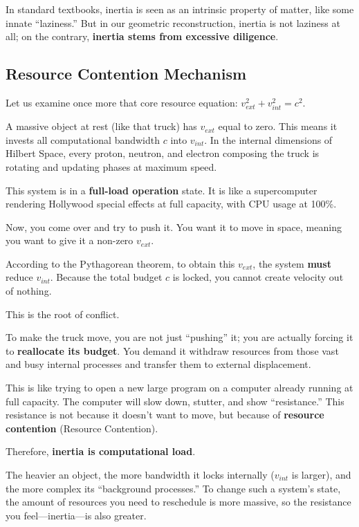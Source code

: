 \documentclass[11pt,a4paper,twoside]{book}
\begin{document}
In standard textbooks, inertia is seen as an intrinsic property of matter, like some innate ``laziness.'' But in our geometric reconstruction, inertia is not laziness at all; on the contrary, \textbf{inertia stems from excessive diligence}.

\subsection{Resource Contention Mechanism}

Let us examine once more that core resource equation: $v_{ext}^2 + v_{int}^2 = c^2$.

A massive object at rest (like that truck) has $v_{ext}$ equal to zero. This means it invests all computational bandwidth $c$ into $v_{int}$. In the internal dimensions of Hilbert Space, every proton, neutron, and electron composing the truck is rotating and updating phases at maximum speed.

This system is in a \textbf{full-load operation} state. It is like a supercomputer rendering Hollywood special effects at full capacity, with CPU usage at 100\%.

Now, you come over and try to push it. You want it to move in space, meaning you want to give it a non-zero $v_{ext}$.

According to the Pythagorean theorem, to obtain this $v_{ext}$, the system \textbf{must} reduce $v_{int}$. Because the total budget $c$ is locked, you cannot create velocity out of nothing.

This is the root of conflict.

To make the truck move, you are not just ``pushing'' it; you are actually forcing it to \textbf{reallocate its budget}. You demand it withdraw resources from those vast and busy internal processes and transfer them to external displacement.

This is like trying to open a new large program on a computer already running at full capacity. The computer will slow down, stutter, and show ``resistance.'' This resistance is not because it doesn't want to move, but because of \textbf{resource contention} (Resource Contention).

Therefore, \textbf{inertia is computational load}.

The heavier an object, the more bandwidth it locks internally ($v_{int}$ is larger), and the more complex its ``background processes.'' To change such a system's state, the amount of resources you need to reschedule is more massive, so the resistance you feel---inertia---is also greater.
\end{document}
